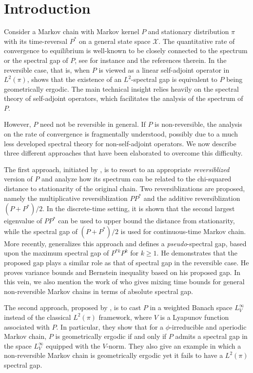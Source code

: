 \documentclass[12pt,a4]{amsart}
\numberwithin{equation}{section}
\theoremstyle{plain}
\theoremstyle{definition}
\theoremstyle{remark}
\newcommand{\1}{\mathds{1}}
\renewcommand{\geq}{\geqslant}
\begin{document}
\tableofcontents
\allowdisplaybreaks

\section{Introduction}

Consider a Markov chain with Markov kernel $P$ and stationary distribution $\pi$ with its time-reversal $P^*$ on a general state space $\mathcal{X}$. The quantitative rate of convergence to equilibrium is well-known to be closely connected to the spectrum or the spectral gap of $P$, see for instance \cite{AF14, LSC97, LPW09, MT06, MT09} and the references therein. In the reversible case, that is, when $P$ is viewed as a linear self-adjoint operator in $L^2(\pi)$, \cite{RR97} shows that the existence of an $L^2$-spectral gap is equivalent to $P$ being geometrically ergodic. The main technical insight relies heavily on the spectral theory of self-adjoint operators, which facilitates the analysis of the spectrum of $P$.

However, $P$ need not be reversible in general. If $P$ is non-reversible, the analysis on the rate of convergence is fragmentally understood, possibly due to a much less developed spectral theory for non-self-adjoint operators. We now describe three different approaches that have been elaborated to overcome this difficulty.

The first approach, initiated by \cite{Fill91}, is to resort to an appropriate \textit{reversiblized} version of $P$ and analyze how its spectrum can be related to the chi-squared distance to stationarity of the original chain. Two reversiblizations are proposed, namely the multiplicative reversiblization $PP^*$ and the additive reversiblization $(P+P^*)/2$. In the discrete-time setting, it is shown that the second largest eigenvalue of $PP^*$ can be used to upper bound the distance from stationarity, while the spectral gap of $(P+P^*)/2$ is used for continuous-time Markov chain. More recently, \cite{Paulin15} generalizes this approach and defines a \textit{pseudo}-spectral gap, based upon the maximum spectral gap of $P^{*k}P^k$ for $k \geq 1$. He demonstrates that the proposed gap plays a similar role as that of spectral gap in the reversible case. He proves variance bounds and Bernstein inequality based on his proposed gap. In this vein, we also mention the work of \cite{J13} who gives mixing time bounds for general non-reversible Markov chains in terms of absolute spectral gap.

The second approach, proposed by \cite{KM12}, is to cast $P$ in a weighted Banach space $L^{\infty}_V$ instead of the classical $L^2(\pi)$ framework, where $V$ is a Lyapunov function associated with $P$. In particular, they show that for a $\phi$-irreducible and aperiodic Markov chain, $P$ is geometrically ergodic if and only if $P$ admits a spectral gap in the space $L^{\infty}_V$ equipped with the $V$-norm. They also give an example in which a non-reversible Markov chain is geometrically ergodic yet it fails to have a $L^2(\pi)$ spectral gap.
\end{document}
